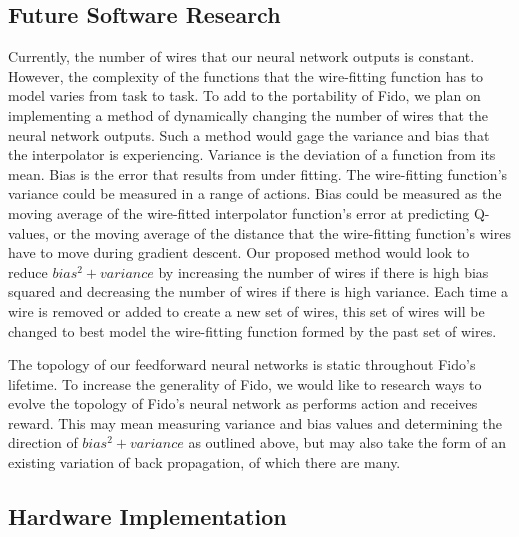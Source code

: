 \subsection{Future Software Research}

Currently, the number of wires that our neural network outputs is constant. However, the complexity of the functions that the wire-fitting function has to model varies from task to task. To add to the portability of Fido, we plan on implementing a method of dynamically changing the number of wires that the neural network outputs. Such a method would gage the variance and bias that the interpolator is experiencing. Variance is the deviation of a function from its mean. Bias is the error that results from under fitting. The wire-fitting function's variance could be measured in a range of actions. Bias could be measured as the moving average of the wire-fitted interpolator function's error at predicting Q-values, or the moving average of the distance that the wire-fitting function's wires have to move during gradient descent. Our proposed method would look to reduce $bias^2 + variance$ by increasing the number of wires if there is high bias squared and decreasing the number of wires if there is high variance. Each time a wire is removed or added to create a new set of wires, this set of wires will be changed to best model the wire-fitting function formed by the past set of wires.

The topology of our feedforward neural networks is static throughout Fido's lifetime. To increase the generality of Fido, we would like to research ways to evolve the topology of Fido's neural network as performs action and receives reward. This may mean measuring variance and bias values and determining the direction of $bias^2 + variance$ as outlined above, but may also take the form of an existing variation of back propagation, of which there are many.

\subsection{Hardware Implementation}